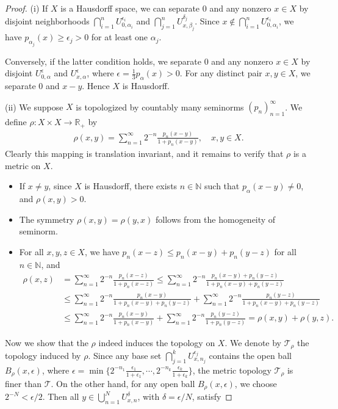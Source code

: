 \documentclass{article}
\numberwithin{equation}{section}
\newcommand{\bbN}{\mathbb{N}}
\newcommand{\bbR}{\mathbb{R}}
\renewcommand{\cal}{\mathcal}
\theoremstyle{plain}
\theoremstyle{definition}
\begin{document}
\begin{proof}
(i) If $X$ is a Hausdorff space, we can separate $0$ and any nonzero $x\in X$ by disjoint neighborhoods $\bigcap_{i=1}^n U_{0,\alpha_i}^{\epsilon_i}$ and $\bigcap_{j=1}^nU_{x,\beta_j}^{\delta_j}$. Since $x\notin\bigcap_{i=1}^n U_{0,\alpha_i}^{\epsilon_i}$, we have $p_{\alpha_j}(x)\geq\epsilon_j>0$ for at least one $\alpha_j$. 

Conversely, if the latter condition holds, we separate $0$ and any nonzero $x\in X$ by disjoint $U_{0,\alpha}^\epsilon$ and $U_{x,\alpha}^{\epsilon}$, where $\epsilon=\frac{1}{3}p_\alpha(x)>0$.  For any distinct pair $x,y\in X$, we separate $0$ and $x-y$. Hence $X$ is Hausdorff.

(ii) We suppose $X$ is topologized by countably many seminorms $(p_n)_{n=1}^\infty$. We define $\rho:X\times X\to\bbR_+$ by
\begin{align*}
	\rho(x,y)=\sum_{n=1}^\infty 2^{-n}\frac{p_n(x-y)}{1+p_n(x-y)},\quad x,y\in X.
\end{align*}
Clearly this mapping is translation invariant, and it remains to verify that $\rho$ is a metric on $X$.
\begin{itemize}
	\item If $x\neq y$, since $X$ is Hausdorff, there exists $n\in\bbN$ such that $p_\alpha(x-y)\neq 0$, and $\rho(x,y)>0$.
	\item The symmetry $\rho(x,y)=\rho(y,x)$ follows from the homogeneity of seminorm.
	\item For all $x,y,z\in X$, we have $p_n(x-z)\leq p_n(x-y)+p_n(y-z)$ for all $n\in\bbN$, and
	\begin{align*}
		\rho(x,z)&=\sum_{n=1}^\infty 2^{-n}\frac{p_n(x-z)}{1+p_n(x-z)}\leq\sum_{n=1}^\infty 2^{-n}\frac{p_n(x-y)+p_n(y-z)}{1+p_n(x-y)+p_n(y-z)}\\
		&\leq\sum_{n=1}^\infty 2^{-n}\frac{p_n(x-y)}{1+p_n(x-y)+p_n(y-z)}+\sum_{n=1}^\infty 2^{-n}\frac{p_n(y-z)}{1+p_n(x-y)+p_n(y-z)}\\
		&\leq\sum_{n=1}^\infty 2^{-n}\frac{p_n(x-y)}{1+p_n(x-y)}+\sum_{n=1}^\infty 2^{-n}\frac{p_n(y-z)}{1+p_n(y-z)}=\rho(x,y)+\rho(y,z).
	\end{align*}
\end{itemize}
Now we show that the $\rho$ indeed induces the topology on $X$. We denote by $\cal{T}_\rho$ the topology induced by $\rho$. Since any base set $\bigcap_{j=1}^k U_{x,n_j}^{\epsilon_j}$ contains the open ball $B_\rho(x,\epsilon)$, where $\epsilon=\min\{2^{-n_1}\frac{\epsilon_1}{1+\epsilon_1},\cdots,2^{-n_k}\frac{\epsilon_k}{1+\epsilon_k}\}$, the metric topology $\cal{T}_\rho$ is finer than $\cal{T}$. On the other hand, for any open ball $B_\rho(x,\epsilon)$, we choose $2^{-N}<\epsilon/2$. Then all $y\in\bigcup_{n=1}^NU_{x,n}^{\delta}$, with $\delta=\epsilon/N$, satisfy

\end{proof}
\end{document}
